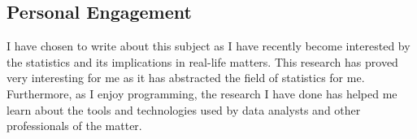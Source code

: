 \documentclass[11pt,letterpaper]{article}
\begin{document}
\subsection{Personal Engagement}

I have chosen to write about this subject as I have recently become interested by the 
statistics and its implications in real-life matters. This research has proved very 
interesting for me as it has abstracted the field of statistics for me. Furthermore, 
as I enjoy programming, the research I have done has helped me learn about the tools 
and technologies used by data analysts and other professionals of the matter. 


\section{}

\printbibliography[heading=bibintoc, title=Works Cited]
\end{document}
